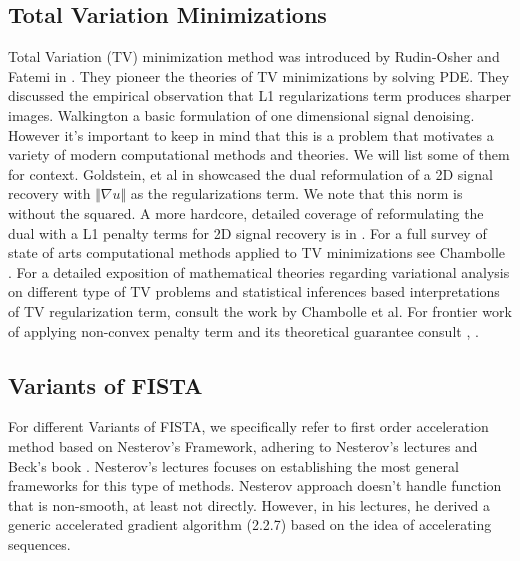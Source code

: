 \documentclass[]{article}
\theoremstyle{definition}
\numberwithin{equation}{subsection}
\begin{document}
    \subsection{Total Variation Minimizations}
        Total Variation (TV) minimization method was introduced by Rudin-Osher and Fatemi in \cite{rudin_nonlinear_1992}. 
        They pioneer the theories of TV minimizations by solving PDE. 
        They discussed the empirical observation that L1 regularizations term produces sharper images. 
        Walkington \cite{noel_nesterovs_nodate} a basic formulation of one dimensional signal denoising. 
        However it's important to keep in mind that this is a problem that motivates a variety of modern computational methods and theories. 
        We will list some of them for context. 
        Goldstein, et al in \cite[3.2.1]{goldstein_field_2016} showcased the dual reformulation of a 2D signal recovery with $\Vert \nabla u\Vert$ as the regularizations term. 
        We note that this norm is without the squared. 
        A more hardcore, detailed coverage of reformulating the dual with a L1 penalty terms for 2D signal recovery is in \cite{beck_fast_2009}. 
        For a full survey of state of arts computational methods applied to TV minimizations see Chambolle \cite{chambolle_introduction_2016}. 
        For a detailed exposition of mathematical theories regarding variational analysis on different type of TV problems and statistical inferences based interpretations of TV regularization term, consult the work by Chambolle et al\cite{fornasier_introduction_2010}. 
        For frontier work of applying non-convex penalty term and its theoretical guarantee consult \cite{an_enhanced_2023}, \cite{an_springback_2022}. 
    \subsection*{Variants of FISTA}
        For different Variants of FISTA, we specifically refer to first order acceleration method based on Nesterov's Framework, adhering to Nesterov's lectures \cite{nesterov_lecture_2018} and Beck's book \cite[chapter 10]{beck_first-order_nodate}. 
        Nesterov's lectures focuses on establishing the most general frameworks for this type of methods. 
        Nesterov approach doesn't handle function that is non-smooth, at least not directly. 
        However, in his lectures, he derived a generic accelerated gradient algorithm (2.2.7) based on the idea of accelerating sequences. 
\end{document}
